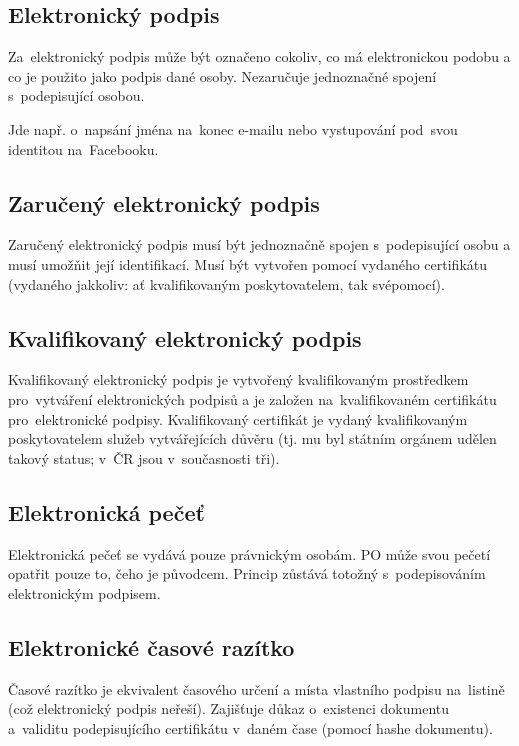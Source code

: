 \subsection{Elektronický podpis}

Za~elektronický podpis může být označeno cokoliv, co má elektronickou podobu a co je použito jako podpis dané osoby.
Nezaručuje jednoznačné spojení s~podepisující osobou.

Jde např. o~napsání jména na~konec e-mailu nebo vystupování pod~svou identitou na~Facebooku.


\subsection{Zaručený elektronický podpis}

Zaručený elektronický podpis musí být jednoznačně spojen s~podepisující osobu a musí umožňit její identifikací.
Musí být vytvořen pomocí vydaného certifikátu (vydaného jakkoliv: ať kvalifikovaným poskytovatelem, tak svépomocí).


\subsection{Kvalifikovaný elektronický podpis}

Kvalifikovaný elektronický podpis je vytvořený kvalifikovaným prostředkem pro~vytváření elektronických podpisů a je založen na~kvalifikovaném certifikátu pro~elektronické podpisy.
Kvalifikovaný certifikát je vydaný kvalifikovaným poskytovatelem služeb vytvářejících důvěru (tj. mu byl státním orgánem udělen takový status; v~ČR jsou v~současnosti tři).


\subsection{Elektronická pečeť}

Elektronická pečeť se vydává pouze právnickým osobám.
PO může svou pečetí opatřit pouze to, čeho je původcem.
Princip zůstává totožný s~podepisováním elektronickým podpisem.


\subsection{Elektronické časové razítko}

Časové razítko je ekvivalent časového určení a místa vlastního podpisu na~listině (což elektronický podpis neřeší).
Zajišťuje důkaz o~existenci dokumentu a~validitu podepisujícího certifikátu v~daném čase (pomocí hashe dokumentu).

